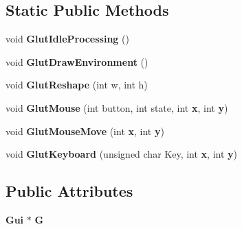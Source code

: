 \subsection*{Static Public Methods}
\begin{CompactItemize}
\item 
void {\bf Glut\-Idle\-Processing} ()
\item 
void {\bf Glut\-Draw\-Environment} ()
\item 
void {\bf Glut\-Reshape} (int w, int h)
\item 
void {\bf Glut\-Mouse} (int button, int state, int {\bf x}, int {\bf y})
\item 
void {\bf Glut\-Mouse\-Move} (int {\bf x}, int {\bf y})
\item 
void {\bf Glut\-Keyboard} (unsigned char Key, int {\bf x}, int {\bf y})
\end{CompactItemize}
\subsection*{Public Attributes}
\begin{CompactItemize}
\item 
{\bf Gui} $\ast$ {\bf G}
\end{CompactItemize}
